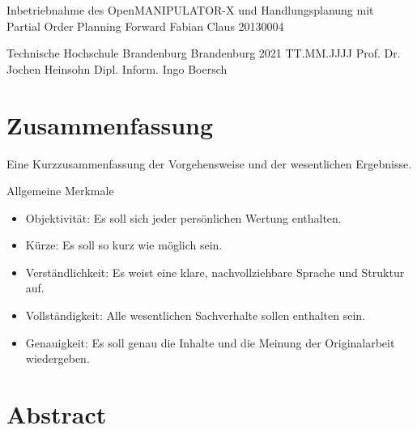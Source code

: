 




  \JMUTitle
      {Inbetriebnahme des OpenMANIPULATOR-X und Handlungsplanung mit\\ Partial Order Planning Forward}        %
      {Fabian Claus}                        %
      {20130004}
      
      {Technische Hochschule Brandenburg}  %
      {Brandenburg 2021}                          %
      {TT.MM.JJJJ}                              %
      {Prof. Dr. Jochen Heinsohn}               %
      {Dipl. Inform. Ingo Boersch}                          %

  \clearpage

\lhead{}
    \setcounter{page}{1}

\tableofcontents
\clearpage

\section*{Zusammenfassung}

Eine Kurzzusammenfassung der Vorgehensweise und der wesentlichen Ergebnisse.

Allgemeine Merkmale
\begin{itemize}
    \item Objektivität: Es soll sich jeder persönlichen Wertung enthalten.
    \item Kürze: Es soll so kurz wie möglich sein.
    \item Verständlichkeit: Es weist eine klare, nachvollziehbare Sprache und Struktur auf.
    \item Vollständigkeit: Alle wesentlichen Sachverhalte sollen enthalten sein.
    \item Genauigkeit: Es soll genau die Inhalte und die Meinung der Originalarbeit wiedergeben.
\end{itemize}{}

\newpage
{}
\section*{Abstract}

